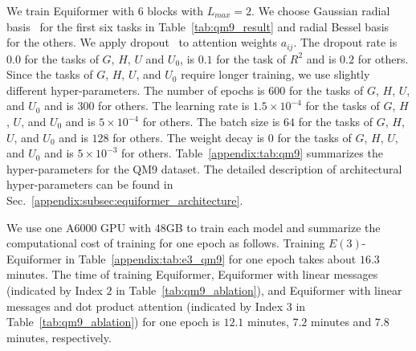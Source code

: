We train Equiformer with 6 blocks with $L_{max} = 2$.
We choose Gaussian radial basis~\citep{schnet, spinconv, gemnet, graphormer_3d} for the first six tasks in Table~\ref{tab:qm9_result} and radial Bessel basis~\citep{dimenet, dimenet_pp} for the others.
We apply dropout~\citep{dropout} to attention weights $a_{ij}$.
The dropout rate is $0.0$ for the tasks of $G$, $H$, $U$ and $U_0$, is $0.1$ for the task of $R^2$ and is $0.2$ for others.
Since the tasks of $G$, $H$, $U$, and $U_0$ require longer training, we use slightly different hyper-parameters.
The number of epochs is $600$ for the tasks of $G$, $H$, $U$, and $U_0$ and is $300$ for others.
The learning rate is $1.5 \times 10 ^{-4}$ for the tasks of $G$, $H$, $U$, and $U_0$ and is $5 \times 10^{-4}$ for others.
The batch size is $64$ for the tasks of $G$, $H$, $U$, and $U_0$ and is $128$ for others.
The weight decay is $0$ for the tasks of $G$, $H$, $U$, and $U_0$ and is $5 \times 10^{-3}$ for others.
Table~\ref{appendix:tab:qm9} summarizes the hyper-parameters for the QM9 dataset.
The detailed description of architectural hyper-parameters can be found in Sec.~\ref{appendix:subsec:equiformer_architecture}. 

We use one A6000 GPU with 48GB to train each model and summarize the computational cost of training for one epoch as follows.
Training $E(3)$-Equiformer in Table~\ref{appendix:tab:e3_qm9} for one epoch takes about $16.3$ minutes.
The time of training Equiformer, Equiformer with linear messages (indicated by Index $2$ in Table~\ref{tab:qm9_ablation}), and Equiformer with linear messages and dot product attention (indicated by Index $3$ in Table~\ref{tab:qm9_ablation}) for one epoch is $12.1$ minutes, $7.2$ minutes and $7.8$ minutes, respectively.




